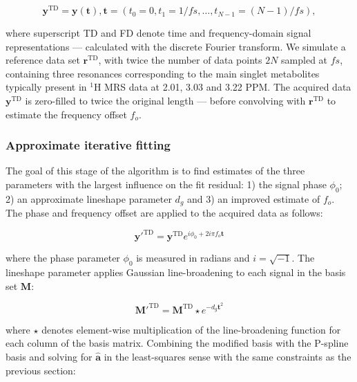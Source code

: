 \documentclass[num-refs]{wiley-article}
\begin{document}
\begin{equation}
  \mathbf{y}^{\mathrm{TD}} = \mathbf{y}(\mathbf{t}), \mathbf{t}=(t_{0}=0,t_{1} =1/\mathit{fs},\ldots,t_{N-1}=(N-1)/\mathit{fs}),
\end{equation}

where superscript TD and FD denote time and frequency-domain signal representations --- calculated with the discrete Fourier transform. We simulate a reference data set $\mathbf{r}^{\mathrm{TD}}$, with twice the number of data points $2N$ sampled at $\mathit{fs}$, containing three resonances corresponding to the main singlet metabolites typically present in $^1\mathrm{H}$ MRS data at 2.01, 3.03 and 3.22 PPM. The acquired data $\mathbf{y}^{\mathrm{TD}}$ is zero-filled to twice the original length --- before convolving with  $\mathbf{r}^{\mathrm{TD}}$ to estimate the frequency offset $f_{o}$.


\subsubsection{Approximate iterative fitting}
The goal of this stage of the algorithm is to find estimates of the three parameters with the largest influence on the fit residual: 1) the signal phase $\phi_{0}$; 2) an approximate lineshape parameter $d_{g}$ and 3) an improved estimate of $f_{o}$. The phase and frequency offset are applied to the acquired data as follows:

\begin{equation}
  \mathbf{y'}^{\mathrm{TD}} = \mathbf{y}^{\mathrm{TD}} e^{i \phi_{0} + 2 i \pi f_{o} \mathbf{t}}
\end{equation}

where the phase parameter $\phi_{0}$ is measured in radians and $i=\sqrt{-1}$. The lineshape parameter applies Gaussian line-broadening to each signal in the basis set $\mathbf{M}$:

\begin{equation}
  \mathbf{M}'^{\mathrm{TD}} = \mathbf{M}^{\mathrm{TD}} \star e^{-d_{g}\mathbf{t}^{2}}
\end{equation}

where $\star$ denotes element-wise multiplication of the line-broadening function for each column of the basis matrix. Combining the modified basis with the P-spline basis and solving for $\hat{\mathbf{a}}$ in the least-squares sense with the same constraints as the previous section:
\end{document}
